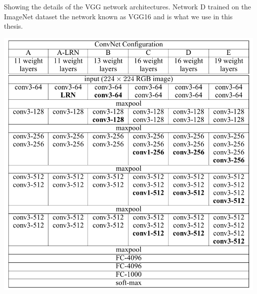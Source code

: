 \documentclass[preprint,12pt]{elsarticle}
\begin{document}
\begin{table}
\caption[vgg architectures]{Showing the details of the VGG network architectures. Network D trained on the ImageNet \cite{Russakovsky2015} dataset the network known as  VGG16 and is what we use in this thesis.}\label{tab:vgg}
\includegraphics[width=\textwidth]{plots/vgg_architectures.png}
\end{table}


\end{document}
